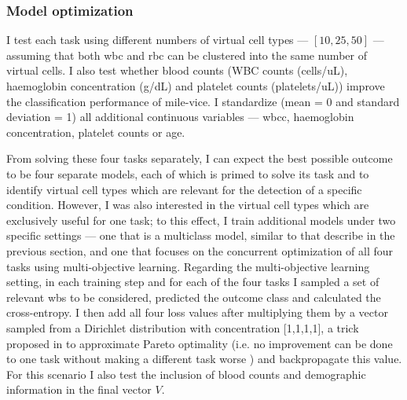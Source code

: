 \subsubsection{Model optimization}

I test each task using different numbers of virtual cell types --- $[10, 25, 50]$ --- assuming that both \ac{wbc} and \ac{rbc} can be clustered into the same number of virtual cells. I also test whether blood counts (WBC counts (cells/uL), haemoglobin concentration (g/dL) and platelet counts (platelets/uL)) improve the classification performance of \ac{mile-vice}. I standardize (mean = 0 and standard deviation = 1) all additional continuous variables --- \ac{wbcc}, haemoglobin concentration, platelet counts or age. 

From solving these four tasks separately, I can expect the best possible outcome to be four separate models, each of which is primed to solve its task and to identify virtual cell types which are relevant for the detection of a specific condition. However, I was also interested in the virtual cell types which are exclusively useful for one task; to this effect, I train additional models under two specific settings --- one that is a multiclass model, similar to that describe in the previous section, and one that focuses on the concurrent optimization of all four tasks using multi-objective learning. Regarding the multi-objective learning setting, in each training step and for each of the four tasks I sampled a set of relevant \ac{wbs} to be considered, predicted the outcome class and calculated the cross-entropy. I then add all four loss values after multiplying them by a vector sampled from a Dirichlet distribution with concentration [1,1,1,1], a trick proposed in \cite{Ruchte2021-ch} to approximate Pareto optimality (i.e. no improvement can be done to one task without making a different task worse \cite{Censor1977-nd}) and backpropagate this value. For this scenario I also test the inclusion of blood counts and demographic information in the final vector $V$.

